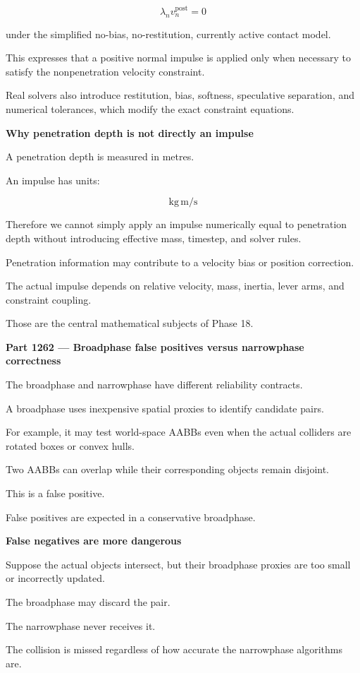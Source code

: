 \[
\boxed{ \lambda_n v_n^{\mathrm{post}}=0 }
\]

under the simplified no-bias, no-restitution, currently active contact model.

This expresses that a positive normal impulse is applied only when necessary to satisfy the nonpenetration velocity constraint.

Real solvers also introduce restitution, bias, softness, speculative separation, and numerical tolerances, which modify the exact constraint equations.

\textbf{Why penetration depth is not directly an impulse}

A penetration depth is measured in metres.

An impulse has units:

\[
\mathrm{kg\,m/s}
\]

Therefore we cannot simply apply an impulse numerically equal to penetration depth without introducing effective mass, timestep, and solver rules.

Penetration information may contribute to a velocity bias or position correction.

The actual impulse depends on relative velocity, mass, inertia, lever arms, and constraint coupling.

Those are the central mathematical subjects of Phase 18.

\textbf{Part 1262 --- Broadphase false positives versus narrowphase correctness}

The broadphase and narrowphase have different reliability contracts.

A broadphase uses inexpensive spatial proxies to identify candidate pairs.

For example, it may test world-space AABBs even when the actual colliders are rotated boxes or convex hulls.

Two AABBs can overlap while their corresponding objects remain disjoint.

This is a false positive.

False positives are expected in a conservative broadphase.

\textbf{False negatives are more dangerous}

Suppose the actual objects intersect, but their broadphase proxies are too small or incorrectly updated.

The broadphase may discard the pair.

The narrowphase never receives it.

The collision is missed regardless of how accurate the narrowphase algorithms are.

